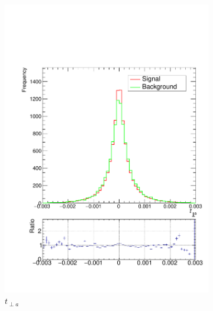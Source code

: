 \documentclass[10pt,a4paper]{book}
\begin{document}
\begin{figure}
\begin{subfigure}{0.33\textwidth}
\includegraphics[scale=0.25]{truth/tper1}
\caption{$t_{\perp a}$}
\end{subfigure}
\begin{subfigure}{.33\textwidth}
\centering

\end{subfigure}
\end{figure}
\end{document}

